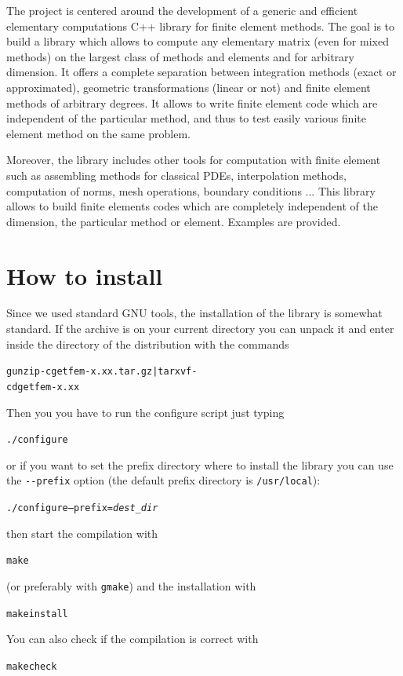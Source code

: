 \documentclass[11pt,a4paper]{article}
\begin{document}
The \gf project is centered around the development of a generic and efficient elementary computations C++ library for finite element methods. The goal is to build a library which allows to compute any elementary matrix (even for mixed methods) on the largest class of methods and elements and for arbitrary dimension. It offers a complete separation between integration methods (exact or approximated), geometric transformations (linear or not) and finite element methods of arbitrary degrees. It allows to write finite element code which are independent of the particular method, and thus to test easily various finite element method on the same problem.

 Moreover, the library includes other tools for computation with finite element such as assembling methods for classical PDEs, interpolation methods, computation of norms, mesh operations, boundary conditions ... This library allows to build finite elements codes which are completely independent of the dimension, the particular method or element. Examples are provided.\\[2cm]
\htmlonly{\\\\\\}


\newpage
\tableofcontents
\newpage

\section{How to install}
Since we used standard GNU tools, the installation of the \gf  library is somewhat standard. If the \gf  archive is on your current directory you can unpack it and enter inside the directory of the distribution  with the commands
\begin{alltt}
  gunzip -c getfem-x.xx.tar.gz | tar xvf -
  cd  getfem-x.xx
\end{alltt}
Then you you have to run the configure script just typing
\begin{alltt}
  ./configure
\end{alltt}
or if you want to set the prefix directory where to install the library you can use the {\tt {-}{-}prefix} option (the default prefix directory is {\tt /usr/local}):
\begin{alltt}
  ./configure --prefix=\textit{dest_dir}
\end{alltt}
then start the compilation with
\begin{alltt}
  make
\end{alltt}
(or preferably with {\tt gmake}) and the installation with
\begin{alltt}
  make install
\end{alltt}
You can also check if the compilation is correct with
\begin{alltt}
  make check
\end{alltt}
\end{document}
